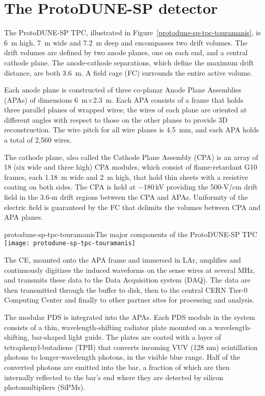 \section{The ProtoDUNE-SP detector}

The ProtoDUNE-SP TPC, illustrated in Figure~\ref{protodune-sp-tpc-touramanis}, is 6~m high, 7~m wide and 7.2~m deep and encompasses two drift volumes. The drift volumes are defined by two anode planes, one on each end, and a central cathode plane. The anode-cathode separations, which define the maximum drift distance, are both 3.6~m. A field cage (FC) surrounds the entire active volume.


Each anode plane is constructed of three co-planar Anode Plane Assemblies (APAs) of dimensions  6~m$\times$2.3~m. Each APA consists of a frame that holds three parallel planes of wrapped wires; the wires of each plane are
oriented at different angles with respect to those on the other planes to provide 3D reconstruction.  The wire pitch for all wire planes is 4.5~mm, and each APA holds a total of 2,560 wires. 

The cathode plane, also called the Cathode Plane Assembly (CPA) is an array of 18 (six wide and three high) CPA modules, which consist of flame-retardant G10 frames, each 1.18~m wide and 2~m high, that hold thin sheets with a resistive coating on both sides. 
The CPA is held at $-$180\,kV providing the 500-V/cm drift field in the 3.6-m drift regions between the CPA and APAs. 
Uniformity of the electric field is guaranteed by the FC that delimits the volumes between CPA and APA planes.
 
\begin{cdrfigure}{protodune-sp-tpc-touramanis}{The major components of the ProtoDUNE-SP TPC}
\texttt{[image: protodune-sp-tpc-touramanis]}
\end{cdrfigure}

The CE, mounted onto the APA frame and immersed in LAr, amplifies and continuously digitizes the induced waveforms on the sense wires at several MHz, and transmits these data to the Data Acquisition system (DAQ). The data are then transmitted through the buffer to disk, then to the central CERN Tier-0 Computing Center and finally to other partner sites for processing and analysis.  

The modular PDS is integrated into the APAs. Each PDS module in the system consists of a thin, wavelength-shifting radiator plate mounted on a wavelength-shifting, bar-shaped light guide. The plates are coated with a
layer of tetraphenyl-butadiene (TPB) that converts incoming VUV (128 nm) %
scintillation photons to longer-wavelength photons, in the visible blue range. Half of the converted photons are emitted into the bar, a fraction of which are then internally reflected to the bar's end where they are detected by silicon photomultipliers (SiPMs).

